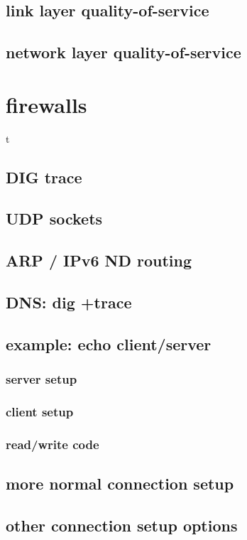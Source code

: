\subsection{link layer quality-of-service}


\subsection{network layer quality-of-service}


\section{firewalls} %

t
\subsection{DIG trace}


\subsection{UDP sockets}


\subsection{ARP / IPv6 ND routing}


\subsection{DNS: dig +trace}



\subsection{example: echo client/server}
\subsubsection{server setup}

\subsubsection{client setup}


\subsubsection{read/write code}



\subsection{more normal connection setup}



\subsection{other connection setup options}





